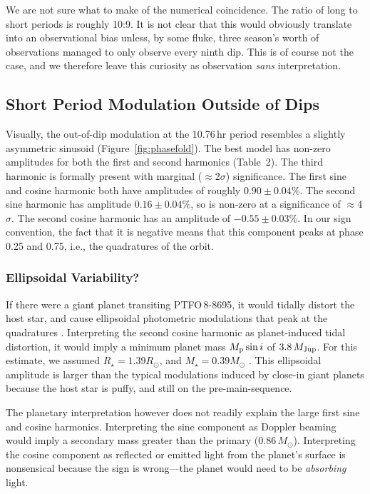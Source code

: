 \documentclass[12pt,twocolumn,tighten]{aastex62}
\newcommand{\ptfo}{PTFO$\,$8-8695}
\begin{document}
We are not sure what to make of the numerical coincidence.  The ratio
of long to short periods is roughly 10:9.  It is not clear that this
would obviously translate into an observational bias unless, by some
fluke, three season's worth of observations managed to only observe
every ninth dip.  This is of course not the case, and we therefore
leave this curiosity as observation {\it sans} interpretation.


\subsection{Short Period Modulation Outside of Dips}
Visually, the out-of-dip modulation at the 10.76$\,$hr period
resembles a slightly asymmetric sinusoid (Figure~\ref{fig:phasefold}).
The best model has non-zero amplitudes for both the first and second
harmonics (Table~2).  The third harmonic is formally present with
marginal ($\approx$2$\sigma$) significance.  The first sine and cosine
harmonic both have amplitudes of roughly $0.90\pm0.04\%$.  The second
sine harmonic has amplitude $0.16 \pm 0.04\%$, so is non-zero at a
significance of $\approx$4$\sigma$.  The second cosine harmonic has an
amplitude of $-0.55 \pm 0.03\%$.  In our sign convention, the fact
that it is negative means that this component peaks at phase 0.25 and
0.75, i.e., the quadratures of the orbit.

\subsubsection{Ellipsoidal Variability?}
If there were a giant planet transiting \ptfo, it would tidally
distort the host star, and cause ellipsoidal photometric modulations
that peak at the quadratures \citep[see][]{shporer_astrophysics_2017}.
Interpreting the second cosine harmonic as planet-induced tidal
distortion, it would imply a minimum planet mass $M_{\rm p} \sin i$ of
$3.8\,M_{\rm Jup}$.  For this estimate, we assumed $R_\star = 1.39
R_\odot$, and $M_\star = 0.39 M_\odot$ \citep{van_eyken_ptf_2012}.
This ellipsoidal amplitude is larger than the typical modulations
induced by close-in giant planets because the host star is puffy, and
still on the pre-main-sequence.

The planetary interpretation however does not readily explain the
large first sine and cosine harmonics.  Interpreting the sine
component as Doppler beaming would imply a secondary mass greater than
the primary ($0.86\,M_\odot$).  Interpreting the cosine component as
reflected or emitted light from the planet's surface is nonsensical
because the sign is wrong---the planet would need to be {\it
absorbing} light.
\end{document}
